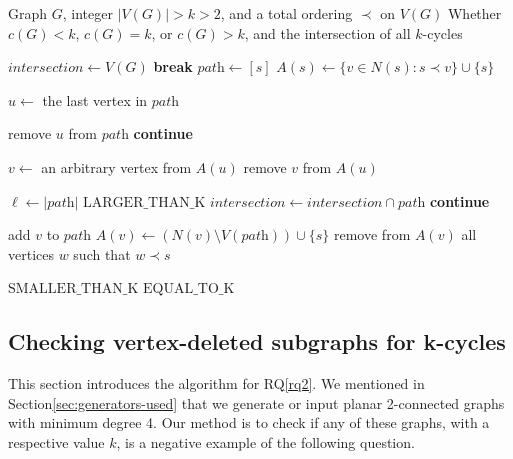 \begin{algorithm}
\caption{\textsc{FindIntersectionK}$(G,k,\prec)$}
\label{alg:find-k-intersection}

\begin{algorithmic}[1]
\Require Graph $G$, integer $|V(G)|>k>2$, and a total ordering $\prec$ on $V(G)$
\Ensure Whether $c(G)<k$, $c(G)=k$, or $c(G)>k$, and the intersection of all $k$-cycles

\State $\textit{intersection} \gets V(G)$
        \State \textbf{break}
    \EndIf
    \State $\textit{path} \gets [s]$
    \State $A(s) \gets \{v \in N(s) : s \prec v\} \cup \{s\}$

        \State $u \gets$ the last vertex in $\textit{path}$

            \State remove $u$ from $\textit{path}$
            \State \textbf{continue}
        \EndIf

        \State $v \gets$ an arbitrary vertex from $A(u)$
        \State remove $v$ from $A(u)$

            \State $\ell \gets |\textit{path}|$
                \State \Return $\text{LARGER\_THAN\_K}$
            \EndIf
                \State $\textit{intersection} \gets
                \textit{intersection} \cap \textit{path}$
            \EndIf
            \State \textbf{continue}
        \EndIf

        \State add $v$ to $\textit{path}$
        \State $A(v) \gets
        (N(v) \setminus V(\textit{path})) \cup \{s\}$
        \State remove from $A(v)$ all vertices $w$ such that $w \prec s$
    \EndWhile
\EndFor

    \State \Return $\text{SMALLER\_THAN\_K}$
\EndIf
\State \Return $\text{EQUAL\_TO\_K}$
\end{algorithmic}
\end{algorithm}

\subsection{Checking vertex-deleted subgraphs for k-cycles}

This section introduces the algorithm for RQ\ref{rq2}. We mentioned in Section\ref{sec:generators-used} that we generate or input planar 2-connected graphs with minimum degree 4. Our method is to check if any of these graphs, with a respective value $k$, is a negative example of the following question.

